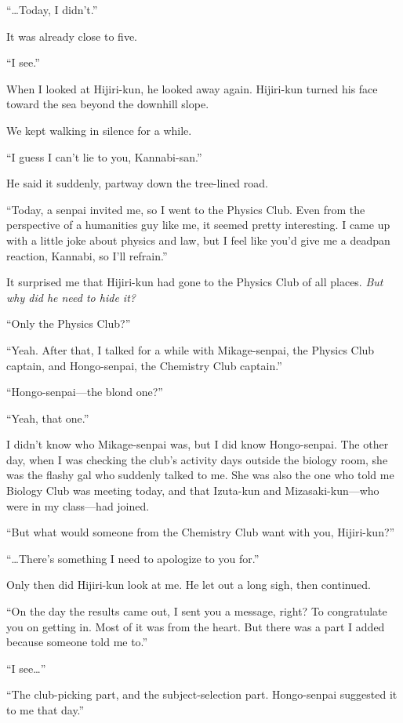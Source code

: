 \documentclass[
    a4paper,
    12pt,
    twoside,
    openany,
    UTF8,
    fontset=windows
]{ctexbook}
\begin{document}
``\dots Today, I didn't.''

It was already close to five.

``I see.''

When I looked at Hijiri-kun, he looked away again. Hijiri-kun turned his face toward the sea beyond the downhill slope.

We kept walking in silence for a while.

``I guess I can't lie to you, Kannabi-san.''

He said it suddenly, partway down the tree-lined road.

``Today, a senpai invited me, so I went to the Physics Club. Even from the perspective of a humanities guy like me, it seemed pretty interesting. I came up with a little joke about physics and law, but I feel like you'd give me a deadpan reaction, Kannabi, so I'll refrain.''

It surprised me that Hijiri-kun had gone to the Physics Club of all places. \textit{But why did he need to hide it?}

``Only the Physics Club?''

``Yeah. After that, I talked for a while with Mikage-senpai, the Physics Club captain, and Hongo-senpai, the Chemistry Club captain.''

``Hongo-senpai---the blond one?''

``Yeah, that one.''

I didn't know who Mikage-senpai was, but I did know Hongo-senpai. The other day, when I was checking the club's activity days outside the biology room, she was the flashy gal who suddenly talked to me. She was also the one who told me Biology Club was meeting today, and that Izuta-kun and Mizasaki-kun---who were in my class---had joined.

``But what would someone from the Chemistry Club want with you, Hijiri-kun?''

``\dots There's something I need to apologize to you for.''

Only then did Hijiri-kun look at me. He let out a long sigh, then continued.

``On the day the results came out, I sent you a message, right? To congratulate you on getting in. Most of it was from the heart. But there was a part I added because someone told me to.''

``I see\dots''

``The club-picking part, and the subject-selection part. Hongo-senpai suggested it to me that day.''
\end{document}
